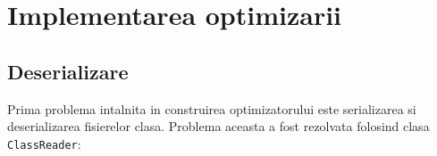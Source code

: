 \chapter{Implementarea optimizarii}

\section{Deserializare}\label{deserializare}

Prima problema intalnita in construirea optimizatorului este
serializarea si deserializarea fisierelor clasa. Problema aceasta
a fost rezolvata folosind clasa \texttt{ClassReader}:



